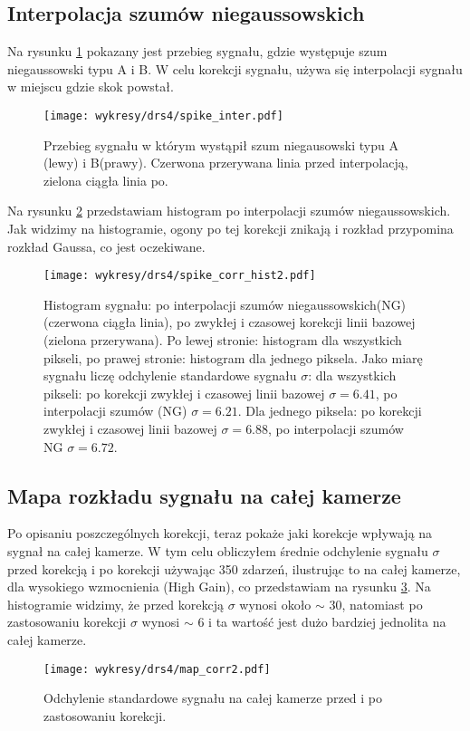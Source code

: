 \documentclass[a4paper,11pt,twoside]{article}
\begin{document}
\subsection{Interpolacja szumów niegaussowskich}
Na rysunku \ref{fig:spike_corr} pokazany jest przebieg sygnału, gdzie występuje szum niegaussowski typu A i B. W celu korekcji sygnału, używa się interpolacji sygnału w miejscu gdzie skok powstał.
\begin{figure}[H] 
\centering
\texttt{[image: wykresy/drs4/spike\_inter.pdf]}
\caption{Przebieg sygnału w którym wystąpił szum niegausowski typu A (lewy) i B(prawy). Czerwona przerywana linia przed interpolacją, zielona ciągła linia po.}
\label{fig:spike_corr}
\end{figure}
Na rysunku \ref{fig:spike_hist} przedstawiam histogram po interpolacji szumów niegaussowskich. Jak widzimy na histogramie, ogony po tej korekcji znikają i rozkład przypomina rozkład Gaussa, co jest oczekiwane.
\begin{figure}[H] 
\centering
\texttt{[image: wykresy/drs4/spike\_corr\_hist2.pdf]}
\caption{Histogram sygnału: po interpolacji szumów niegaussowskich(NG) (czerwona ciągła linia), po zwykłej i czasowej korekcji linii bazowej (zielona przerywana). Po lewej stronie: histogram dla wszystkich pikseli, po prawej stronie: histogram dla jednego piksela.
Jako miarę sygnału liczę odchylenie standardowe sygnału $\sigma$: dla wszystkich pikseli: po korekcji zwykłej i czasowej linii bazowej $\sigma = 6.41$, po interpolacji szumów (NG) $\sigma = 6.21$. Dla jednego piksela: po korekcji zwykłej i czasowej linii bazowej $\sigma = 6.88$, po interpolacji szumów NG $\sigma = 6.72$.}
\label{fig:spike_hist}
\end{figure}
\subsection{Mapa rozkładu sygnału na całej kamerze}
Po opisaniu poszczególnych korekcji, teraz pokaże jaki korekcje wpływają na sygnał na całej kamerze. W tym celu obliczyłem średnie odchylenie sygnału $\sigma$ przed korekcją i po korekcji używając 350 zdarzeń, ilustrując to na całej kamerze, dla  wysokiego wzmocnienia (High Gain), co przedstawiam na rysunku \ref{fig:map_cam_corr}. Na histogramie widzimy, że przed korekcją $\sigma$ wynosi około $\sim$ 30, natomiast po zastosowaniu korekcji $\sigma$ wynosi $\sim$ 6 i ta wartość jest dużo bardziej jednolita na całej kamerze.
\begin{figure}[H] 
\centering
\texttt{[image: wykresy/drs4/map\_corr2.pdf]}
\caption{Odchylenie standardowe sygnału na całej kamerze przed i po zastosowaniu korekcji.}
\label{fig:map_cam_corr}
\end{figure}
\end{document}
